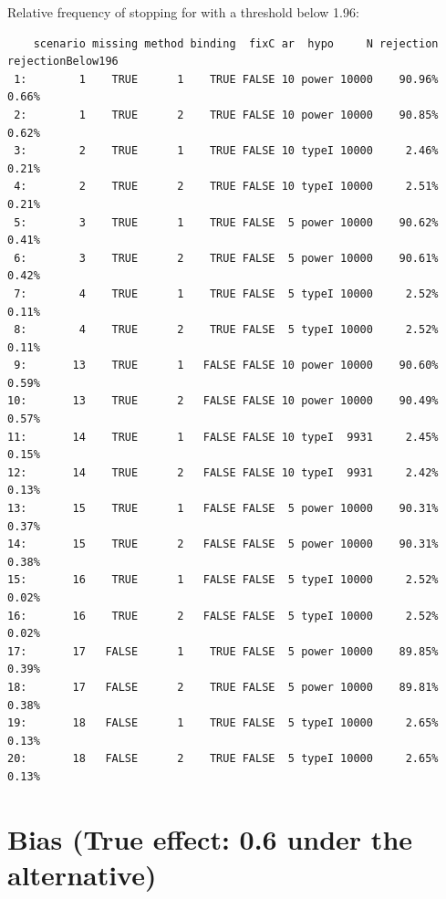 \documentclass[12pt]{article}
\begin{document}
Relative frequency of stopping for with a threshold below 1.96:
\begin{verbatim}
    scenario missing method binding  fixC ar  hypo     N rejection rejectionBelow196
 1:        1    TRUE      1    TRUE FALSE 10 power 10000    90.96%             0.66%
 2:        1    TRUE      2    TRUE FALSE 10 power 10000    90.85%             0.62%
 3:        2    TRUE      1    TRUE FALSE 10 typeI 10000     2.46%             0.21%
 4:        2    TRUE      2    TRUE FALSE 10 typeI 10000     2.51%             0.21%
 5:        3    TRUE      1    TRUE FALSE  5 power 10000    90.62%             0.41%
 6:        3    TRUE      2    TRUE FALSE  5 power 10000    90.61%             0.42%
 7:        4    TRUE      1    TRUE FALSE  5 typeI 10000     2.52%             0.11%
 8:        4    TRUE      2    TRUE FALSE  5 typeI 10000     2.52%             0.11%
 9:       13    TRUE      1   FALSE FALSE 10 power 10000    90.60%             0.59%
10:       13    TRUE      2   FALSE FALSE 10 power 10000    90.49%             0.57%
11:       14    TRUE      1   FALSE FALSE 10 typeI  9931     2.45%             0.15%
12:       14    TRUE      2   FALSE FALSE 10 typeI  9931     2.42%             0.13%
13:       15    TRUE      1   FALSE FALSE  5 power 10000    90.31%             0.37%
14:       15    TRUE      2   FALSE FALSE  5 power 10000    90.31%             0.38%
15:       16    TRUE      1   FALSE FALSE  5 typeI 10000     2.52%             0.02%
16:       16    TRUE      2   FALSE FALSE  5 typeI 10000     2.52%             0.02%
17:       17   FALSE      1    TRUE FALSE  5 power 10000    89.85%             0.39%
18:       17   FALSE      2    TRUE FALSE  5 power 10000    89.81%             0.38%
19:       18   FALSE      1    TRUE FALSE  5 typeI 10000     2.65%             0.13%
20:       18   FALSE      2    TRUE FALSE  5 typeI 10000     2.65%             0.13%
\end{verbatim}


\clearpage

\section{Bias (True effect: 0.6 under the alternative)}
\label{sec:orgd678b31}
\end{document}
